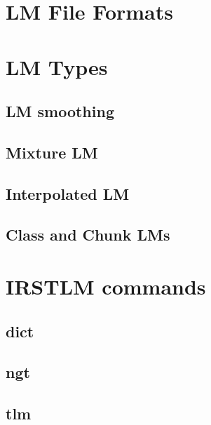 \documentclass[11pt]{article}
\begin{document}
\newpage
\section{LM File Formats}
\label{sec:LMFileFormats}


\newpage
\section{LM Types}
\label{sec:LMTypes}

\subsection{LM smoothing}
\label{sec:LMsmoothing}


\subsection{Mixture LM}
\label{sec:mixtureLM}


\subsection{Interpolated LM}
\label{sec:InterpolatedLM}


\newpage
\subsection{Class and Chunk LMs}
\label{sec:ClassAndChunkLMs}


\newpage
\section{IRSTLM commands}
\label{sec:commands}

\subsection{dict}
\label{sec:dict}


\subsection{ngt}
\label{sec:ngt}


\subsection{tlm}
\label{sec:tlm}

\end{document}
